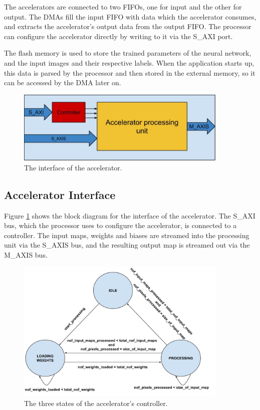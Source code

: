 The accelerators are connected to two FIFOs, one for input and the other for output. The DMAs fill the input FIFO with data which the accelerator consumes, and extracts the accelerator's output data from the output FIFO. The processor can configure the accelerator directly by writing to it via the S\_AXI port.

The flash memory is used to store the trained parameters of the neural network, and the input images and their respective labels. When the application starts up, this data is parsed by the processor and then stored in the external memory, so it can be accessed by the DMA later on.  



\begin{figure}[h!]
  \centering
      \includegraphics[width=0.9\textwidth]{Figures/Method/accelerator_interface}
    \caption[The interface of the accelerator.]{The interface of the accelerator.}
    \label{fig_accelerator_interface}
\end{figure}


\subsection{Accelerator Interface}

Figure \ref{fig_accelerator_interface} shows the block diagram for the interface of the accelerator. The S\_AXI bus, which the processor uses to configure the accelerator, is connected to a controller. The input maps, weights and biases are streamed into the processing unit via the S\_AXIS bus, and the resulting output map is streamed out via the M\_AXIS bus.

\begin{figure}[h!]
  \centering
      \includegraphics[width=0.9\textwidth]{Figures/Method/accelerator_state_machine}
    \caption[Controller's states]{The three states of the accelerator's controller.}
    \label{fig_accelerator_state_machine}
\end{figure}

